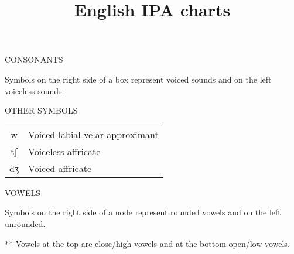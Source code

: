 \documentclass{article}
\title{English IPA charts}
\date{}
\newcommand{\headspace}{0.4cm}
\begin{document}
  \maketitle
  CONSONANTS

  \vspace{\headspace}

  \begin{adjustbox}{width=\textwidth}
    
  \end{adjustbox}

  {\tiny *Symbols on the right side of a box represent voiced sounds and on the left voiceless sounds.}

  \vspace{2cm}

  \parbox[l]{0.5\textwidth}{
    OTHER SYMBOLS

    \vspace{\headspace}

    \begin{adjustbox}{width=0.3\textwidth}
      \begin{tabular}{c l}
        w  & Voiced labial-velar approximant \\
        tʃ & Voiceless affricate \\
        dʒ & Voiced affricate
      \end{tabular}
    \end{adjustbox}
  }
  \parbox[r]{0.5\textwidth}{
    VOWELS

    \vspace{\headspace}

    \begin{adjustbox}{width=0.3\textwidth}
      
    \end{adjustbox}
  }

  \begin{flushright}
    {\tiny *Symbols on the right side of a node represent rounded vowels and on the left unrounded.

    ** Vowels at the top are close/high vowels and at the bottom open/low vowels.}
  \end{flushright}

  {\small
    
  }
\end{document}
